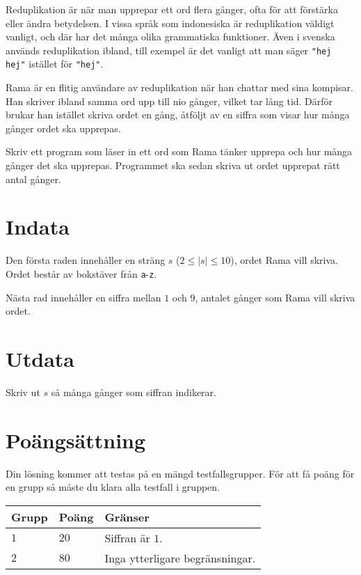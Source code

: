\noindent

Reduplikation är när man upprepar ett ord flera gånger, ofta för att förstärka eller ändra betydelsen.
I vissa språk som indonesiska är reduplikation väldigt vanligt, och där har det många olika
grammatiska funktioner. Även i svenska används reduplikation ibland, till exempel är det vanligt
att man säger \texttt{"hej hej"} istället för \texttt{"hej"}.

Rama är en flitig användare av reduplikation när han chattar med sina kompisar. Han skriver ibland samma ord
upp till nio gånger, vilket tar lång tid. Därför brukar han istället skriva ordet en gång, åtföljt av en
siffra som visar hur många gånger ordet ska upprepas.

Skriv ett program som läser in ett ord som Rama tänker upprepa
och hur många gånger det ska upprepas. 
Programmet ska sedan skriva ut ordet upprepat rätt antal gånger.

\section*{Indata}
Den första raden innehåller en sträng $s$ ($2 \leq |s| \leq 10$), ordet Rama vill skriva.
Ordet består av bokstäver från \texttt{a}-\texttt{z}.

Nästa rad innehåller en siffra mellan $1$ och $9$, antalet gånger som Rama vill skriva ordet.

\section*{Utdata}
Skriv ut $s$ så många gånger som siffran indikerar. 


\section*{Poängsättning}
Din lösning kommer att testas på en mängd testfallsgrupper.
För att få poäng för en grupp så måste du klara alla testfall i gruppen.

\noindent
\begin{tabular}{| l | l | p{12cm} |}
  \hline
  \textbf{Grupp} & \textbf{Poäng} & \textbf{Gränser} \\ \hline
  $1$    & $20$       & Siffran är $1$. \\ \hline
  $2$    & $80$       & Inga ytterligare begränsningar. \\ \hline
\end{tabular}
